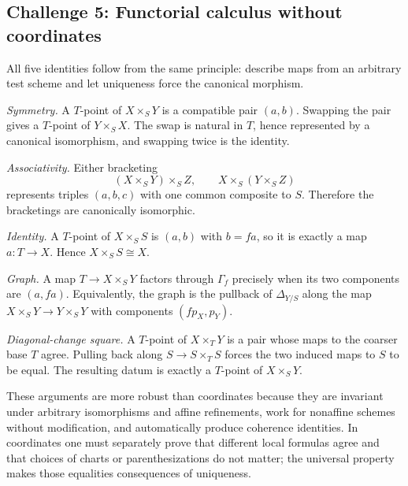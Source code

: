 \subsection*{Challenge 5: Functorial calculus without coordinates}
\begin{solution}
All five identities follow from the same principle: describe maps from an arbitrary test scheme
and let uniqueness force the canonical morphism.

\emph{Symmetry.}
A $T$-point of $X\times_SY$ is a compatible pair $(a,b)$.  Swapping the pair gives a $T$-point of
$Y\times_SX$.  The swap is natural in $T$, hence represented by a canonical isomorphism, and
swapping twice is the identity.

\emph{Associativity.}
Either bracketing
\[
(X\times_SY)\times_SZ,\qquad X\times_S(Y\times_SZ)
\]
represents triples $(a,b,c)$ with one common composite to $S$.  Therefore the bracketings are
canonically isomorphic.

\emph{Identity.}
A $T$-point of $X\times_SS$ is $(a,b)$ with $b=fa$, so it is exactly a map $a:T\to X$.
Hence $X\times_SS\cong X$.

\emph{Graph.}
A map $T\to X\times_SY$ factors through $\Gamma_f$ precisely when its two components are
$(a,fa)$.  Equivalently, the graph is the pullback of $\Delta_{Y/S}$ along the map
$X\times_SY\to Y\times_SY$ with components $(fp_X,p_Y)$.

\emph{Diagonal-change square.}
A $T$-point of $X\times_TY$ is a pair whose maps to the coarser base $T$ agree.  Pulling back along
$S\to S\times_TS$ forces the two induced maps to $S$ to be equal.  The resulting datum is exactly
a $T$-point of $X\times_SY$.

These arguments are more robust than coordinates because they are invariant under arbitrary
isomorphisms and affine refinements, work for nonaffine schemes without modification, and
automatically produce coherence identities.  In coordinates one must separately prove that
different local formulas agree and that choices of charts or parenthesizations do not matter;
the universal property makes those equalities consequences of uniqueness.
\end{solution}
